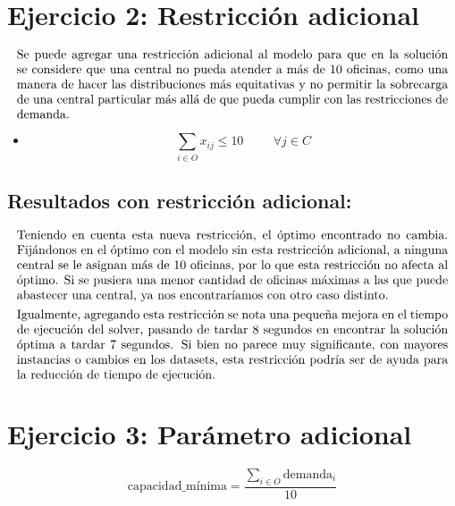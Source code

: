 \documentclass{article}
\begin{document}
\section*{Ejercicio 2: Restricción adicional}
\[
\parbox{\textwidth}{Se puede agregar una restricción adicional al modelo para que en la solución se considere que una central no pueda atender a más de 10 oficinas, como una manera de hacer las distribuciones más equitativas y no permitir la sobrecarga de una central particular más allá de que pueda cumplir con las restricciones de demanda.}
\]


\begin{itemize}
    \item {}
    \[
   \sum_{i \in O} x_{ij} \leq 10 \hspace{1cm}\forall j \in C
    \]
\end{itemize}
\subsection*{Resultados con restricción adicional:}
\[
\parbox{\textwidth}{Teniendo en cuenta esta nueva restricción, el óptimo encontrado no cambia. Fijándonos en el óptimo con el modelo sin esta restricción adicional, a ninguna central se le asignan más de 10 oficinas, por lo que esta restricción no afecta al óptimo. Si se pusiera una menor cantidad de oficinas máximas a las que puede abastecer una central, ya nos encontraríamos con otro caso distinto.}
\]
\[
\parbox{\textwidth}{Igualmente, agregando esta restricción se nota una pequeña mejora en el tiempo de ejecución del solver, pasando de tardar 8 segundos en encontrar la solución óptima a tardar 7 segundos. Si bien no parece muy significante, con mayores instancias o cambios en los datasets, esta restricción podría ser de ayuda para la reducción de tiempo de ejecución.}
\]

\section*{Ejercicio 3: Parámetro adicional}

\[
\text{capacidad\_mínima} = \frac{\sum_{i \in O} \text{demanda}_i}{10}
\]
\end{document}

